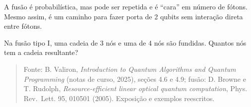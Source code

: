 A fusão é probabilística, mas pode ser repetida e é ``cara'' em número de fótons. Mesmo assim, é um caminho para fazer porta de 2 qubits sem interação direta entre fótons.

Na fusão tipo I, uma cadeia de 3 nós e uma de 4 nós são fundidas. Quantos nós tem a cadeia resultante?

\begin{quote}
Fonte: B. Valiron, \emph{Introduction to Quantum Algorithms and Quantum Programming} (notas de curso, 2025), seções 4.6 e 4.9; fusão: D. Browne e T. Rudolph, \emph{Resource-efficient linear optical quantum computation}, Phys. Rev.~Lett. 95, 010501 (2005). Exposição e exemplos reescritos.
\end{quote}

